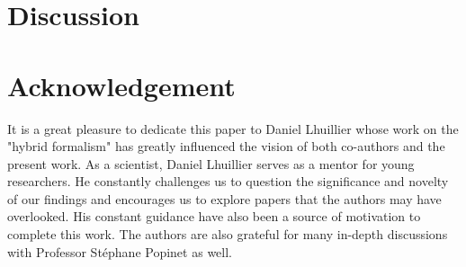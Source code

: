\documentclass[11pt]{My_preprint}
\begin{document}
\section{Discussion}
\label{sec:conclusion}

%



\section*{Acknowledgement}
It is a great pleasure to dedicate this paper to Daniel Lhuillier whose work on the "hybrid formalism" has greatly influenced the vision of both co-authors and the present work. 
As a scientist, Daniel Lhuillier serves as a mentor for young researchers. 
He constantly challenges us to question the significance and novelty of our findings and encourages us to explore papers that the authors may have overlooked.
His constant guidance have also been a source of motivation to complete this work.
The authors are also grateful for many in-depth discussions with Professor St\'ephane Popinet as well. 



\appendix




% 
% 
% 


\end{document}
